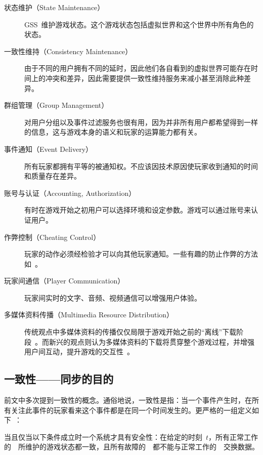 \begin{description}
\item[状态维护（State Maintenance）]
GSS~维护游戏状态。这个游戏状态包括虚拟世界和这个世界中所有角色的状态。

\item[一致性维持（Consistency Maintenance）]
由于不同的用户拥有不同的延时，因此他们各自看到的虚拟世界可能存在时间上的冲突和差异，因此需要提供一致性维持服务来减小甚至消除此种差异。

\item[群组管理（Group Management）]
对用户分组以及事件过滤服务也很有用，因为并非所有用户都希望得到一样的信息，这与游戏本身的语义和玩家的运算能力都有关。

\item[事件通知（Event Delivery）]
所有玩家都拥有平等的被通知权。不应该因技术原因使玩家收到通知的时间和质量存在差异。

\item[账号与认证（Accounting, Authorization）]
有时在游戏开始之初用户可以选择环境和设定参数。游戏可以通过账号来认证用户。

\item[作弊控制（Cheating Control）]
玩家的动作必须经检验才可以向其他玩家通知。一些有趣的防止作弊的方法如~\cite{cheat1, cheat2, cheat3, cheat4}。

\item[玩家间通信（Player Communication）]
玩家间实时的文字、音频、视频通信可以增强用户体验。

\item[多媒体资料传播（Multimedia Resource Distribution）]
传统观点中多媒体资料的传播仅仅局限于游戏开始之前的“离线”下载阶段~\cite{traditional}。而新兴的观点则认为多媒体资料的下载将贯穿整个游戏过程，并增强用户间互动，提升游戏的交互性~\cite{modern1, modern2, modern3}。
\end{description}



\subsection{一致性——同步的目的}
\label{def}

前文中多次提到一致性的概念。通俗地说，一致性是指：当一个事件产生时，在所有关注此事件的玩家看来这个事件都是在同一个时间发生的。更严格的一组定义如下~\cite{Ferretti2005}：

\begin{zjudefine} [安全性]
当且仅当以下条件成立时一个系统才具有安全性：在给定的时刻~$t$，所有正常工作的~\gss~所维护的游戏状态都一致，且所有故障的~\gss~都不能与正常工作的~\gss~交换数据。
\end{zjudefine}

